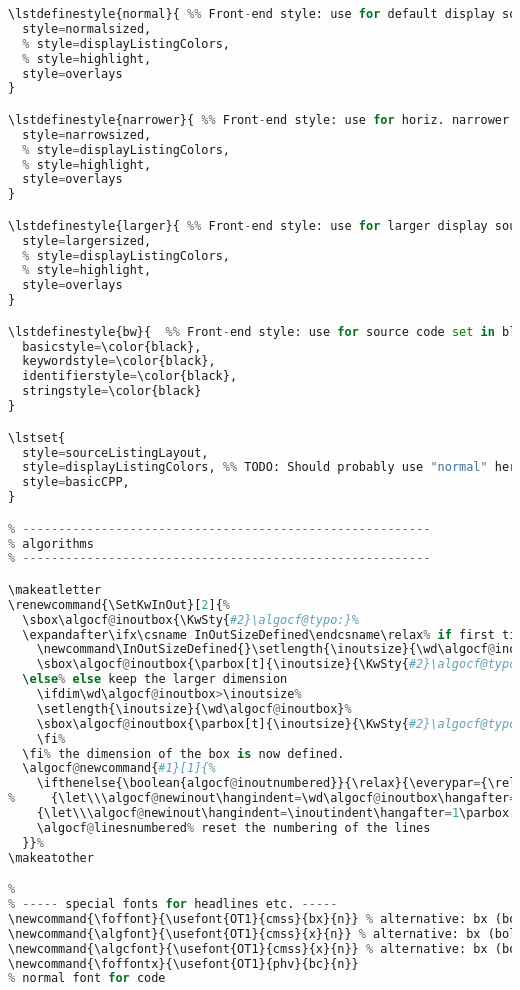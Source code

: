{\begin{lstlisting}[language=Python,style=normal,escapechar=?,morekeywords={True, False}, mathescape]
\lstdefinestyle{normal}{ %% Front-end style: use for default display source code
  style=normalsized,
  % style=displayListingColors,
  % style=highlight,
  style=overlays
}

\lstdefinestyle{narrower}{ %% Front-end style: use for horiz. narrower display source code
  style=narrowsized,
  % style=displayListingColors,
  % style=highlight,
  style=overlays
}

\lstdefinestyle{larger}{ %% Front-end style: use for larger display source code
  style=largersized,
  % style=displayListingColors,
  % style=highlight,
  style=overlays
}

\lstdefinestyle{bw}{  %% Front-end style: use for source code set in black & white
  basicstyle=\color{black},
  keywordstyle=\color{black},
  identifierstyle=\color{black},
  stringstyle=\color{black}
}

\lstset{
  style=sourceListingLayout,
  style=displayListingColors, %% TODO: Should probably use "normal" here
  style=basicCPP,
}

% ---------------------------------------------------------
% algorithms
% ---------------------------------------------------------

\makeatletter
\renewcommand{\SetKwInOut}[2]{%
  \sbox\algocf@inoutbox{\KwSty{#2}\algocf@typo:}%
  \expandafter\ifx\csname InOutSizeDefined\endcsname\relax% if first time used
    \newcommand\InOutSizeDefined{}\setlength{\inoutsize}{\wd\algocf@inoutbox}%
    \sbox\algocf@inoutbox{\parbox[t]{\inoutsize}{\KwSty{#2}\algocf@typo:\hfill}~}\setlength{\inoutindent}{\wd\algocf@inoutbox}%
  \else% else keep the larger dimension
    \ifdim\wd\algocf@inoutbox>\inoutsize%
    \setlength{\inoutsize}{\wd\algocf@inoutbox}%
    \sbox\algocf@inoutbox{\parbox[t]{\inoutsize}{\KwSty{#2}\algocf@typo:\hfill}~}\setlength{\inoutindent}{\wd\algocf@inoutbox}%
    \fi%
  \fi% the dimension of the box is now defined.
  \algocf@newcommand{#1}[1]{%
    \ifthenelse{\boolean{algocf@inoutnumbered}}{\relax}{\everypar={\relax}}%
%     {\let\\\algocf@newinout\hangindent=\wd\algocf@inoutbox\hangafter=1\parbox[t]{\inoutsize}{\KwSty{#2}\algocf@typo\hfill:}~##1\par}%
    {\let\\\algocf@newinout\hangindent=\inoutindent\hangafter=1\parbox[t]{\inoutsize}{\KwSty{#2}\algocf@typo:\hfill}~##1\par}%
    \algocf@linesnumbered% reset the numbering of the lines
  }}%
\makeatother

%
% ----- special fonts for headlines etc. -----
\newcommand{\foffont}{\usefont{OT1}{cmss}{bx}{n}} % alternative: bx (bold extended) -> sbc (semi bold condensed)
\newcommand{\algfont}{\usefont{OT1}{cmss}{x}{n}} % alternative: bx (bold extended) -> sbc (semi bold condensed)
\newcommand{\algcfont}{\usefont{OT1}{cmss}{x}{n}} % alternative: bx (bold extended) -> sbc (semi bold condensed)
\newcommand{\foffontx}{\usefont{OT1}{phv}{bc}{n}}
% normal font for code


\end{lstlisting}}
